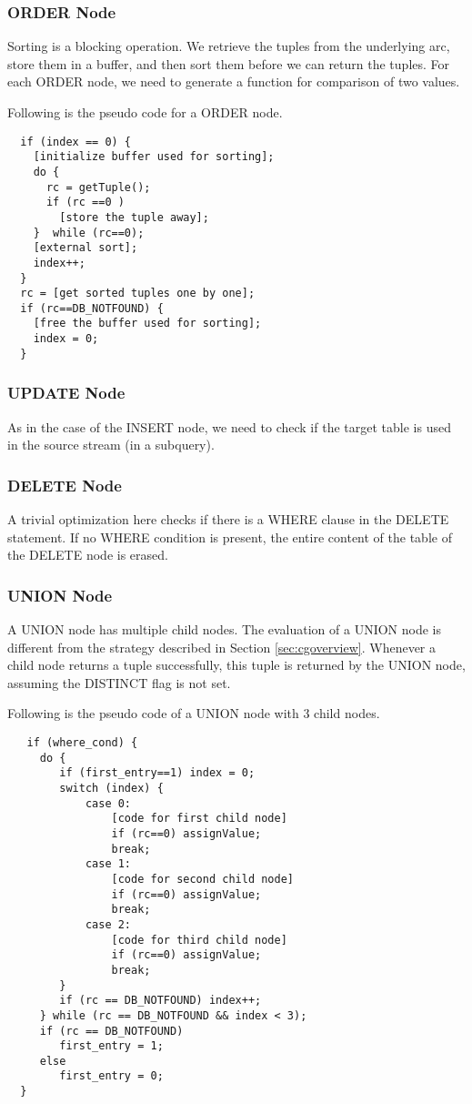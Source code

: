 \subsubsection*{ORDER Node}
Sorting is a blocking operation. We retrieve the tuples from the
underlying arc, store them in a buffer, and then sort them before we
can return the tuples. For each ORDER node, we need to generate a
function for comparison of two values. 

Following is the pseudo code for a ORDER node.

{
\renewcommand{\baselinestretch}{1}
\begin{verbatim}
  if (index == 0) {
    [initialize buffer used for sorting];
    do {
      rc = getTuple();
      if (rc ==0 )
        [store the tuple away];
    }  while (rc==0);
    [external sort];
    index++;
  }
  rc = [get sorted tuples one by one];
  if (rc==DB_NOTFOUND) {
    [free the buffer used for sorting];
    index = 0;
  }
\end{verbatim}
}  

\subsubsection*{UPDATE Node}
As in the case of the INSERT node, we need to check if the target
table is used in the source stream (in a subquery).

\subsubsection*{DELETE Node}
A trivial optimization here checks if there is a WHERE clause in the
DELETE statement. If no WHERE condition is present, the entire content
of the table of the DELETE node is erased.

\subsubsection*{UNION Node}
A UNION node has multiple child nodes. The evaluation of a UNION node
is different from the strategy described in Section
\ref{sec:cgoverview}. Whenever a child node returns a tuple
successfully, this tuple is returned by the UNION node, assuming the
DISTINCT flag is not set.

Following is the pseudo code of a UNION node with 3 child nodes.

{
\renewcommand{\baselinestretch}{1}
\begin{verbatim}
   if (where_cond) {
     do {
        if (first_entry==1) index = 0;
        switch (index) {
            case 0:
                [code for first child node]
                if (rc==0) assignValue;
                break;
            case 1:
                [code for second child node]
                if (rc==0) assignValue;
                break;
            case 2:
                [code for third child node]
                if (rc==0) assignValue;
                break;
        }
        if (rc == DB_NOTFOUND) index++;
     } while (rc == DB_NOTFOUND && index < 3);
     if (rc == DB_NOTFOUND) 
        first_entry = 1; 
     else
        first_entry = 0; 
  }
\end{verbatim}
}


